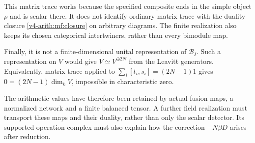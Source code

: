 This matrix trace works because the specified composite ends in
the simple object \(\rho\) and is scalar there.
It does not identify ordinary matrix trace with the duality
closure \eqref{v4-arith:mf:closure} on arbitrary diagrams.
The finite realization also keeps its chosen categorical
intertwiners, rather than every bimodule map.

Finally, it is not a finite-dimensional unital representation of
\(\mathcal B_I\).
Such a representation on \(V\) would give
\(V\simeq V^{\oplus2N}\) from the Leavitt generators.
Equivalently, matrix trace applied to
\(\sum_i[t_i,s_i]=(2N-1)1\) gives
\(0=(2N-1)\dim_kV\), impossible in characteristic zero.

The arithmetic values have therefore been retained by actual
fusion maps, a normalized network and a finite balanced tensor.
A further field realization must transport these maps and their
duality, rather than only the scalar detector.
Its supported operation complex must also explain how the
correction \(-N\beta D\) arises after reduction.
